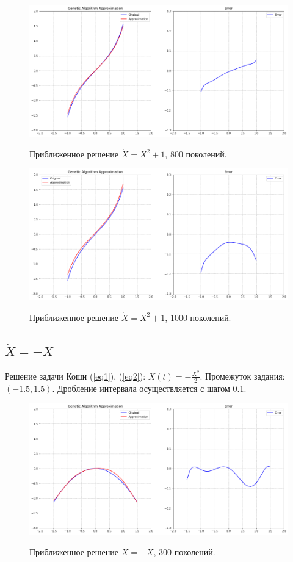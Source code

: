 \documentclass[12pt, a4paper]{article}
\begin{document}
    \begin{figure}[h!]
        \center
        \includegraphics[width = 13cm]{f2_800.png}
        \label{image322}
        \caption{Приближенное решение $\dot{X} = X^{2} + 1$, 800 поколений.}
    \end{figure}
    
    \begin{figure}[h!]
        \center
        \includegraphics[width = 13cm]{f2_1000.png}
        \label{image323}
        \caption{Приближенное решение $\dot{X} = X^{2} + 1$, 1000 поколений.}
    \end{figure}
    
    \subsection{$\dot{X} = -X$}
    
    Решение задачи Коши (\ref{eq1}), (\ref{eq2}): $X(t) = -\frac{X^{2}}{2}$. 
    Промежуток задания: $(-1.5, 1.5)$. Дробление интервала осуществляется с 
    шагом 0.1.
    
    \begin{figure}[h!]
        \center
        \includegraphics[width = 13cm]{f3_300.png}
        \label{image331}
        \caption{Приближенное решение $\dot{X} = -X$, 300 поколений.}
    \end{figure}
    
\end{document}
